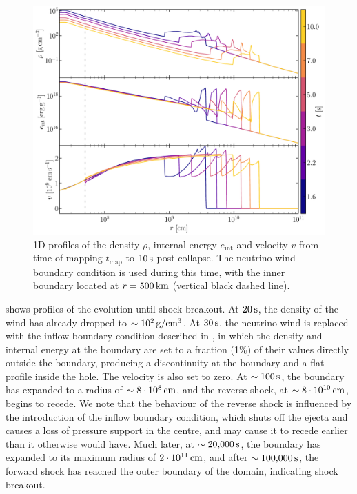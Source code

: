 \begin{figure}[ht!]
    \centering
    \includegraphics[width=1.0\linewidth]{figures/short_1d.pdf}
    \caption{1D profiles of the density \(\rho\), internal energy \(e_\mathrm{int}\) and velocity \(v\) from time of mapping \(t_\mathrm{map}\) to \(10\,\mathrm{s}\) post-collapse. The neutrino wind boundary condition is used during this time, with the inner boundary located at \(r=500\,\mathrm{km}\) (vertical black dashed line).}
    \label{fig:short_1d}
\end{figure}

 shows profiles of the evolution until shock breakout. At \(20\,\mathrm{s}\), the density of the wind has already dropped to \(\sim10^2\,\mathrm{g/cm^3}\). At \(30\,\mathrm{s}\), the neutrino wind is replaced with the inflow boundary condition described in , in which the density and internal energy at the boundary are set to a fraction (1\%) of their values directly outside the boundary, producing a discontinuity at the boundary and a flat profile inside the hole. The velocity is also set to zero. At \(\sim100\,\mathrm{s}\), the boundary has expanded to a radius of \(\sim8\cdot10^8\,\mathrm{cm}\), and the reverse shock, at \(\sim8\cdot10^{10}\,\mathrm{cm}\), begins to recede. We note that the behaviour of the reverse shock is influenced by the introduction of the inflow boundary condition, which shuts off the ejecta and causes a loss of pressure support in the centre, and may cause it to recede earlier than it otherwise would have. Much later, at \(\sim20{,}000\,\mathrm{s}\), the boundary has expanded to its maximum radius of \(2\cdot10^{11}\,\mathrm{cm}\), and after \(\sim100{,}000\,\mathrm{s}\), the forward shock has reached the outer boundary of the domain, indicating shock breakout.


